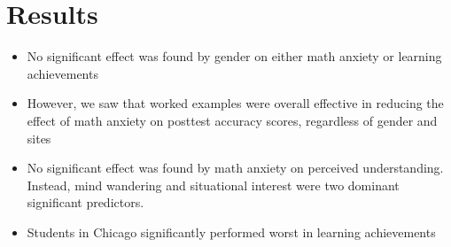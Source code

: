 \documentclass[
  letterpaper,
  DIV=11,
  numbers=noendperiod]{scrartcl}
\begin{document}
\hypertarget{results}{%
\section{Results}\label{results}}

\begin{itemize}
\item
  No significant effect was found by gender on either math anxiety or
  learning achievements
\item
  However, we saw that worked examples were overall effective in
  reducing the effect of math anxiety on posttest accuracy scores,
  regardless of gender and sites
\item
  No significant effect was found by math anxiety on perceived
  understanding. Instead, mind wandering and situational interest were
  two dominant significant predictors.
\item
  Students in Chicago significantly performed worst in learning
  achievements
\end{itemize}
\end{document}
